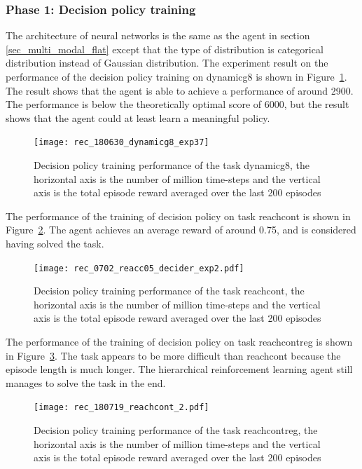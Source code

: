 \subsubsection{Phase 1: Decision policy training}
The architecture of neural networks is the same as the agent in section \ref{sec_multi_modal_flat} except that the type of distribution is categorical distribution instead of Gaussian distribution.
The experiment result on the performance of the decision policy training on dynamicg8 is shown in Figure~\ref{fig:rec_dynamicg8_decider_subt10}. The result shows that the agent is able to achieve a performance of around 2900. The performance is below the theoretically optimal score of 6000, but the result shows that the agent could at least learn a meaningful policy.

\begin{figure}[!htbp]
\centering
\texttt{[image: rec\_180630\_dynamicg8\_exp37]}
\caption{Decision policy training performance of the task dynamicg8, the horizontal axis is the number of million time-steps and the vertical axis is the total episode reward averaged over the last 200 episodes}
\label{fig:rec_dynamicg8_decider_subt10}
\end{figure}

The performance of the training of decision policy on task reachcont is shown in Figure~\ref{fig:rec_reachc05_decider_subt10}. The agent achieves an average reward of around 0.75, and is considered having solved the task.
\begin{figure}[!htbp]
\centering
\texttt{[image: rec\_0702\_reacc05\_decider\_exp2.pdf]}
\caption{Decision policy training performance of the task reachcont, the horizontal axis is the number of million time-steps and the vertical axis is the total episode reward averaged over the last 200 episodes}
\label{fig:rec_reachc05_decider_subt10}
\end{figure}

The performance of the training of decision policy on task reachcontreg is shown in Figure~\ref{rec_reachcontreg}. The task appears to be more difficult than reachcont because the episode length is much longer. The hierarchical reinforcement learning agent still manages to solve the task in the end.
\begin{figure}[!htbp]
	\centering
	\texttt{[image: rec\_180719\_reachcont\_2.pdf]}
	\caption{Decision policy training performance of the task reachcontreg, the horizontal axis is the number of million time-steps and the vertical axis is the total episode reward averaged over the last 200 episodes}
	\label{rec_reachcontreg}
\end{figure}


